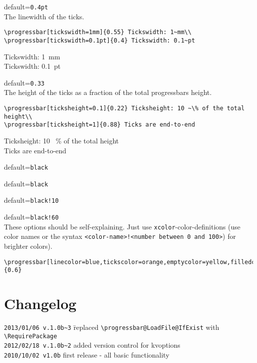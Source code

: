 \documentclass{ltxdoc}
\begin{document}
 default=\texttt{0.4pt}\\
	The linewidth of the ticks.
\begin{lstlisting}
\progressbar[tickswidth=1mm]{0.55} Tickswidth: 1~mm\\
\progressbar[tickswidth=0.1pt]{0.4} Tickswidth: 0.1~pt
\end{lstlisting}
	 Tickswidth: 1~mm\\
	 Tickswidth: 0.1~pt

 default=\texttt{0.33}\\
	The height of the ticks as a fraction of the total progressbars height.
\begin{lstlisting}
\progressbar[ticksheight=0.1]{0.22} Ticksheight: 10 ~\% of the total height\\
\progressbar[ticksheight=1]{0.88} Ticks are end-to-end
\end{lstlisting}
	 Ticksheight: 10 ~\% of the total height\\
	 Ticks are end-to-end

 default=\texttt{black}

 default=\texttt{black}

 default=\texttt{black!10}

 default=\texttt{black!60}\\
These options should be self-explaining. Just use \texttt{xcolor}-color-definitions (use color names or the syntax \lstinline+<color-name>!<number between 0 and 100>+) for brighter colors).
\begin{lstlisting}
\progressbar[linecolor=blue,tickscolor=orange,emptycolor=yellow,filledcolor=red]{0.6}
\end{lstlisting}

\section{Changelog}
\begin{tabbing}
\texttt{2013/01/06 v.1.0b\~{}3} \= replaced \lstinline+\progressbar@LoadFile@IfExist+ with\\ \> \lstinline+\RequirePackage+\\
\texttt{2012/02/18 v.1.0b\~{}2} \> added version control for kvoptions\\
\texttt{2010/10/02 v1.0b} \> first release - all basic functionality
\end{tabbing}
\end{document}
